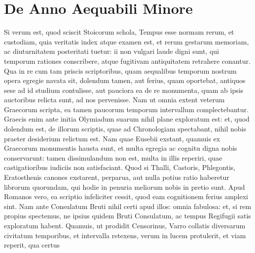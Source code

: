 

\chapter{De Anno Aequabili Minore}

Si verum est, quod sciscit Stoicorum
schola, Tempus esse normam rerum, et
custodiam, quia veritatis index atque examen
est, et rerum gestarum memoriam, ac
diuturnitatem posteritati tuetur: ii non vulgari
laude digni sunt, qui temporum rationes
conscribere, atque fugitivam antiquitatem
retrahere conantur.
Qua in re cum
tam priscis scriptoribus, quam aequalibus
temporum nostrum opera egregie navata sit, dolendum tamen, aut
ferius, quam oportebat, antiquos sese ad id studium contulisse, aut pauciora
ea de re monumenta, quam ab ipsis auctoribus relicta sunt, ad
nos pervenisse.
Nam ut omnia extent veterum Graecorum scripta, ea
tamen paucorum temporum intervallum complectebantur.
Graecis
enim ante initia Olymiadum suarum nihil plane exploratum est: et,
quod dolendum est, de illorum scriptis, quae ad Chronologiam spectabant,
nihil nobis praeter desiderium relictum est.
Nam quae Eusebii exstant,
quamuis ex Graecorum monumentis hausta sunt, et multa egregia
ac cognitu digna nobis conservarunt: tamen dissimulandum non est,
multa in illis reperiri, quae castigatioribus iudiciis non satisfaciant.
Quod si Thalli, Castoris, Phlegontis,
 Eratosthenis canones exstarent,
perparua, aut nulla potius ratio haberetur librorum quorundam, qui
hodie in penuria meliorum nobis in pretio sunt.
Apud Romanos vero,
ea scriptio infeliciter cessit, quod eam cognitionem ferius amplexi sint.
Nam ante Consulatum Bruti nihil certi apud illos: omnia fabulosa: et,
si rem propius spectemus, ne ipsius quidem Bruti Consulatum, ac tempus
Regifugii satis exploratum habent.
Quamuis, ut prodidit Censorinus,
Varro collatis diversarum civitatum temporibus, et intervalla retexens,
verum in lucem protulerit, et viam reperit, qua certus
